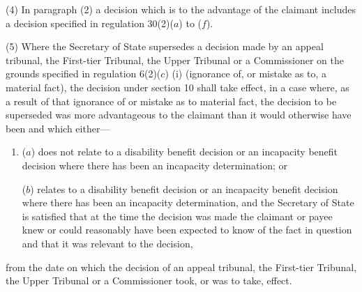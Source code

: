 \documentclass[12pt,a4paper]{article}
\begin{document}
(4) In paragraph (2) a decision which is to the advantage of the claimant includes a decision specified in regulation 30(2)($a$) to ($f$).

%

(5) Where the Secretary of State supersedes a decision made by 
an appeal tribunal, the First-tier Tribunal, the Upper Tribunal or a Commissioner  %
on the grounds specified in regulation 6(2)($c$)%
(i)  %
(ignorance of, or mistake as to, a material fact), the decision under section 10 shall take effect, in a case where, as a result of that ignorance of or mistake as to material fact, the decision to be superseded was more advantageous to the claimant than it would otherwise have been and which either—
\begin{enumerate}\item[]
($a$) does not relate to a disability benefit decision or an incapacity benefit decision where there has been an incapacity determination; or

($b$) relates to a disability benefit decision or an incapacity benefit decision where there has been an incapacity determination, and the Secretary of State is satisfied that at the time the decision was made the claimant or payee knew or could reasonably have been expected to know of the fact in question and that it was relevant to the decision,
\end{enumerate}
from the date on which the decision of 
an appeal tribunal, the First-tier Tribunal, the Upper Tribunal or a Commissioner  %
took, or was to take, effect.
\end{document}
